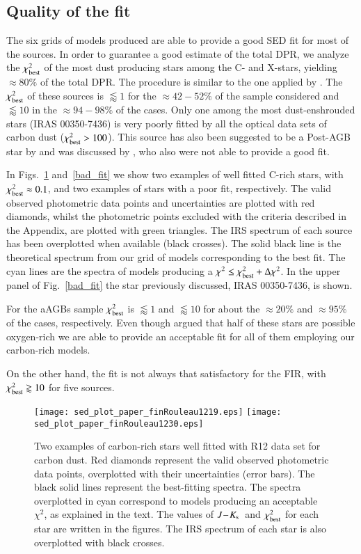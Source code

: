 \documentclass[useAMS,usenatbib]{mn2e/mn2e}
\newcommand{\jks}{\mbox{$J\!-\!K_{\rm s}$}}
\begin{document}
\subsection{Quality of the fit}
The six grids of models produced are able to provide a good SED fit for most of the sources.
In order to guarantee a good estimate of the total DPR, we analyze the $\chi^2_{\rm best}$ of the most dust producing stars among the C- and X-stars, yielding $\approx80\%$ of the total DPR. The procedure is similar to the one applied by \citet{Srinivasan16}.
The $\chi^2_{\rm best}$ of these sources is $\lessapprox 1$ for the $\approx42-52\%$ of the sample considered and $\lessapprox 10$ in the $\approx94-98\%$ of the cases.
Only one among the most dust-enshrouded stars (IRAS 00350-7436) is very poorly fitted by all the optical data sets of carbon dust ($\chi^2_{\rm best}>100$). 
This source has also been suggested to be a Post-AGB star by \citet{Matsuura05} and
was discussed by \citet{Srinivasan16}, who also were not able to provide a good fit.

In Figs.~\ref{good_fit} and~\ref{bad_fit} we show two examples of well fitted C-rich stars, with $\chi^2_{\rm best}\approx0.1$, and two examples of stars with a poor fit, respectively. The valid observed photometric data points and uncertainties are plotted with red diamonds, whilst the photometric points excluded with the criteria described in the Appendix, are plotted with green triangles. The IRS spectrum of each source has been overplotted when available (black crosses). The solid black line is the theoretical spectrum from our grid of models corresponding to the best fit. The cyan lines are the spectra of models producing a $\chi^2\le \chi^2_{\rm best}+\Delta\chi^2$.
In the upper panel of Fig.~\ref{bad_fit} the star previously discussed, IRAS 00350-7436, is shown.

For the aAGBs sample $\chi^2_{\rm best}$ is $\lessapprox 1$ and  $\lessapprox 10$ for about the $\approx20\%$ and $\approx95\%$ of the cases, respectively.
Even though \citet{Boyer15} argued that half of these stars are possible oxygen-rich we are able to provide an acceptable fit for all of them employing our carbon-rich models.

On the other hand, the fit is not always that satisfactory for the FIR, with $\chi^2_{\rm best}\gtrapprox10$ for five sources. 

\begin{figure}
\texttt{[image: sed\_plot\_paper\_finRouleau1219.eps]}
\texttt{[image: sed\_plot\_paper\_finRouleau1230.eps]}
        \caption{Two examples of carbon-rich stars well fitted with R12 data set for carbon dust. Red diamonds represent the valid observed photometric data points, overplotted with their uncertainties (error bars). The black solid lines represent the best-fitting spectra. The spectra overplotted in cyan correspond to models producing an acceptable $\chi^2$, as explained in the text. The values of \jks\ and $\chi^2_{\rm best}$ for each star are written in the figures. The IRS spectrum of each star is also overplotted with black crosses. }
        \label{good_fit}
        \end{figure}
\end{document}
